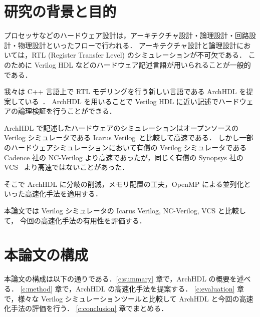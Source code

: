 \section{研究の背景と目的}

プロセッサなどのハードウェア設計は，アーキテクチャ設計・論理設計・回路設計・物理設計といったフローで行われる．
アーキテクチャ設計と論理設計においては，RTL (Register Transfer Level) のシミュレーションが不可欠である．
このために Verilog HDL などのハードウェア記述言語が用いられることが一般的である．

我々は C++ 言語上で RTL モデリングを行う新しい言語である ArchHDL を提案している~\cite{satos:archhdl}．
ArchHDL を用いることで Verilog HDL に近い記述でハードウェアの論理検証を行うことができる．

ArchHDL で記述したハードウェアのシミュレーションはオープンソースの Verilog シミュレータである Icarus Verilog~\cite{iverilog}と比較して高速である．
しかし一部のハードウェアシミュレーションにおいて有償の Verilog シミュレータである Cadence 社の NC-Verilog より高速であったが，同じく有償の Synopsys 社の VCS~\cite{vcs} より高速ではないことがあった．

そこで ArchHDL に分岐の削減，メモリ配置の工夫，OpenMP による並列化といった高速化手法を適用する．

本論文では Verilog シミュレータの Icarus Verilog, NC-Verilog, VCS と比較して，
今回の高速化手法の有用性を評価する．

\section{本論文の構成}

本論文の構成は以下の通りである．\ref{c:summary} 章で，ArchHDL の概要を述べる．
\ref{c:method} 章で，ArchHDL の高速化手法を提案する．
\ref{c:evaluation} 章で，様々な Verilog シミュレーションツールと比較して ArchHDL と今回の高速化手法の評価を行う．
\ref{c:conclusion} 章でまとめる．